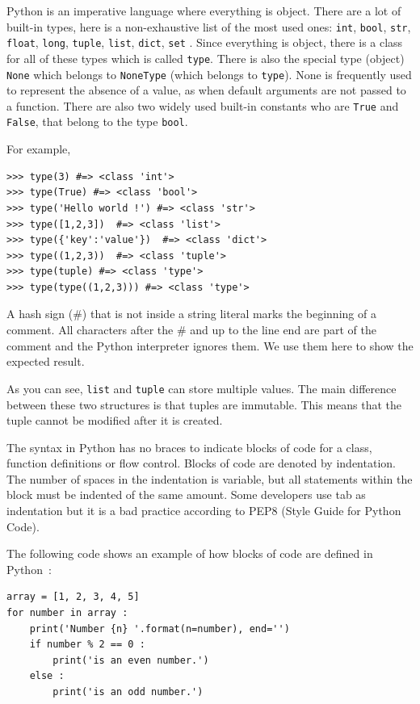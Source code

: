\documentclass[a4paper,10pt]{article}
\begin{document}
Python is an imperative language where everything is object.
There are a lot of built-in types, here is a non-exhaustive list of the most used ones: \lstinline{int}, \lstinline{bool}, \lstinline{str}, \lstinline{float}, \lstinline{long}, \lstinline{tuple}, \lstinline{list}, \lstinline{dict}, \lstinline{set} \cite{python:types}.
Since everything is object, there is a class for all of these types which is called \lstinline{type}.
There is also the special type (object) \lstinline{None} which belongs to \lstinline{NoneType} (which belongs to \lstinline{type}).
None is frequently used to represent the absence of a value, as when default arguments are not passed to a function.
There are also two widely used built-in constants who are \lstinline{True} and \lstinline{False}, that belong to the type \lstinline{bool}\cite{python:types}.

For example,
\begin{lstlisting}
>>> type(3) #=> <class 'int'>
>>> type(True) #=> <class 'bool'>
>>> type('Hello world !') #=> <class 'str'>
>>> type([1,2,3])  #=> <class 'list'>
>>> type({'key':'value'})  #=> <class 'dict'>
>>> type((1,2,3))  #=> <class 'tuple'>
>>> type(tuple) #=> <class 'type'>
>>> type(type((1,2,3))) #=> <class 'type'>
\end{lstlisting}

A hash sign (\#) that is not inside a string literal marks the beginning of a comment.
All characters after the \# and up to the line end are part of the comment and the Python interpreter ignores them.
We use them here to show the expected result.

As you can see, \lstinline|list| and \lstinline|tuple| can store multiple values.
The main difference between these two structures is that tuples are immutable.
This means that the tuple cannot be modified after it is created.

The syntax in Python has no braces to indicate blocks of code for a class, function definitions or flow control.
Blocks of code are denoted by indentation.
The number of spaces in the indentation is variable, but all statements within the block must be indented of the same amount.
Some developers use tab as indentation but it is a bad practice according to PEP8 (Style Guide for Python Code).

The following code shows an example of how blocks of code are defined in \mbox{Python :}

\begin{lstlisting}
array = [1, 2, 3, 4, 5]
for number in array :
    print('Number {n} '.format(n=number), end='')
    if number % 2 == 0 :
        print('is an even number.')
    else :
        print('is an odd number.')
\end{lstlisting}
\end{document}
